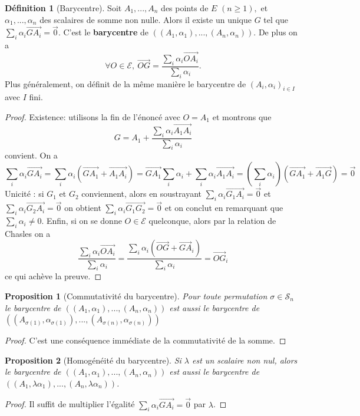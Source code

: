 \documentclass[french]{book}
\theoremstyle{plain}
\newtheorem{prop}{Proposition}[chapter]
\theoremstyle{definition}
\newtheorem{dfn}{Définition}[chapter]
\theoremstyle{remark}
\begin{document}
\begin{dfn}[Barycentre]
	Soit $A_1, ..., A_n$ des points de $E$ $(n \geqslant 1),$ et $\alpha_1, ..., \alpha_n$ des scalaires de somme non nulle. Alors il existe un unique $G$ tel que $\sum_i \alpha_i \overrightarrow{GA_i} = \overrightarrow{0}.$ C'est le \textbf{barycentre} de $((A_1, \alpha_1), ..., (A_n, \alpha_n))$. De plus on a $$\forall O \in \mathcal{E},\ \overrightarrow{OG} = \frac{\sum_i \alpha_i \overrightarrow{OA_i}}{\sum_i \alpha_i}.$$ Plus généralement, on définit de la même manière le barycentre de $(A_i, \alpha_i)_{i \in I}$ avec $I$ fini.
\end{dfn}
\begin{proof}
	Existence: utilisons la fin de l'énoncé avec $O=A_{1}$ et montrons que
$$G=A_{1}+\frac{\sum_{i}\alpha_{i}\overrightarrow{A_{1}A_{i}}}{\sum_{i}\alpha_{i}}$$
convient. On a $$\sum_{i}\alpha_{i}\overrightarrow{GA_{i}}=\sum_{i}\alpha_{i}(\overrightarrow{GA_{1}}+\overrightarrow{A_{1}A_{i}})=\overrightarrow{GA_{1}}\sum_{i}\alpha_{i}+\sum_{i}\alpha_{i}\overrightarrow{A_{1}A_{i}}=(\sum_{i}\alpha_{i})(\overrightarrow{GA_{1}}+\overrightarrow{A_{1}G})=\overrightarrow{0}$$
Unicité : si $G_{1}$ et $G_{2}$ conviennent, alors en soustrayant $\displaystyle\sum_{i}\alpha_{i}\overrightarrow{G_{1}A_{i}}=\overrightarrow{0}$ et $\displaystyle\sum_{i}\alpha_{i}\overrightarrow{G_{2}A_{i}}=\overrightarrow{0}$ on obtient $\displaystyle\sum_{i}\alpha_{i}\overrightarrow{G_{1}G_{2}}=\overrightarrow{0}$ et on conclut en remarquant que $\displaystyle\sum_{i}\alpha_{i}\ne0$.
Enfin, si on se donne $O\in\mathcal{E}$ quelconque, alors par la relation de Chasles on a$$\frac{\sum_{i}\alpha_{i}\overrightarrow{OA_{i}}}{\sum_{i}\alpha_{i}}=\frac{\sum_{i}\alpha_{i}(\overrightarrow{OG}+\overrightarrow{GA}_{i})}{\sum_{i}\alpha_{i}}=\overrightarrow{OG}_{i}$$
ce qui achève la preuve.
\end{proof}
\begin{prop}[Commutativité du barycentre]
	Pour toute permutation $\sigma\in\mathcal{S}_{n}$ le barycentre de $((A_{1},\alpha_{1}),...,(A_{n},\alpha_{n}))$ est aussi le barycentre de $((A_{\sigma(1)},\alpha_{\sigma(1)}),...,(A_{\sigma(n)},\alpha_{\sigma(n)}))$
\end{prop}
\begin{proof}
	C'est une conséquence immédiate de la commutativité de la somme.
\end{proof}

\begin{prop}[Homogénéité du barycentre]
	Si $\lambda$ est un scalaire non nul, alors le barycentre de $((A_{1},\alpha_{1}),...,(A_{n},\alpha_{n}))$ est aussi le barycentre de $((A_{1},\lambda\alpha_{1}),...,(A_{n},\lambda\alpha_{n}))$.
\end{prop}
\begin{proof}
	Il suffit de multiplier l'égalité $\displaystyle\sum_{i}\alpha_{i}\overrightarrow{GA_{i}}=\overrightarrow{0}$ par $\lambda$.
\end{proof}
\end{document}
